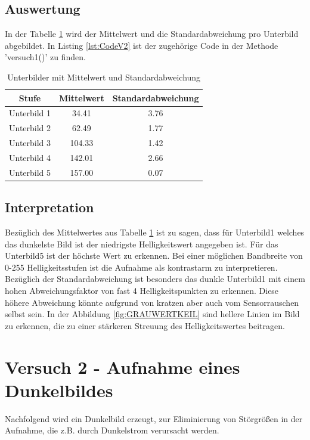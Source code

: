 \documentclass[12pt,oneside,a4paper]{report}
\begin{document}
\section{Auswertung}
\label{chap:VERSUCH_1_AUSWERTUNG}
In der Tabelle \ref{tab:Unterbilder} wird der Mittelwert und die Standardabweichung pro Unterbild abgebildet. In Listing \ref{lst:CodeV2} ist der zugehörige Code in der Methode 'versuch1()' zu finden.

\begin{table}[H]
\begin{tabular}{ccc}
\hline
\textbf{Stufe} &\textbf{ Mittelwert} & \textbf{Standardabweichung} \\
\hline
Unterbild 1 & 34.41 & 3.76 \\
\hline
Unterbild 2 & 62.49 & 1.77 \\
\hline
Unterbild 3 & 104.33 & 1.42 \\
\hline
Unterbild 4 & 142.01 & 2.66 \\
\hline
Unterbild 5 & 157.00 & 0.07 \\
\hline
\end{tabular} 
\caption{Unterbilder mit Mittelwert und Standardabweichung}
\label{tab:Unterbilder}
\end{table}

\section{Interpretation}
\label{chap:VERSUCH_1_INTERPRETATION}
Bezüglich des Mittelwertes aus Tabelle \ref{tab:Unterbilder} ist zu sagen, dass für Unterbild1 welches das dunkelste Bild ist der niedrigste Helligkeitswert angegeben ist. Für das Unterbild5 ist der höchste Wert zu erkennen. Bei einer möglichen Bandbreite von 0-255 Helligkeitsstufen ist die Aufnahme als kontrastarm zu interpretieren.
Bezüglich der Standardabweichung ist besonders das dunkle Unterbild1 mit einem hohen Abweichungsfaktor von fast 4 Helligkeitspunkten zu erkennen.
Diese höhere Abweichung könnte aufgrund von kratzen aber auch vom Sensorrauschen selbst sein. In der Abbildung \ref{fig:GRAUWERTKEIL} sind hellere Linien im Bild zu erkennen, die zu einer stärkeren Streuung des Helligkeitswertes beitragen.

%
%
\chapter{Versuch 2 - Aufnahme eines Dunkelbildes}
\label{chap:VERSUCH_2}
Nachfolgend wird ein Dunkelbild erzeugt, zur Eliminierung von Störgrößen in der Aufnahme, die z.B. durch Dunkelstrom verursacht werden.
\end{document}
